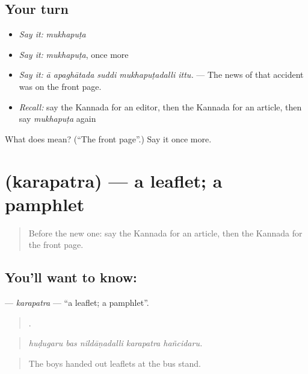 \subsection*{Your turn}
\begin{itemize}
\raggedright
  \item \emph{Say it:} \emph{mukhapuṭa}
  \item \emph{Say it:} \emph{mukhapuṭa}, once more
  \item \emph{Say it:} \emph{ā apaghātada suddi mukhapuṭadalli ittu.} — The news of that accident was on the front page.
  \item \emph{Recall:} say the Kannada for an editor, then the Kannada for an article, then say \emph{mukhapuṭa} again
\end{itemize}

\begin{tcolorbox}[breakable,colback=teal!4,colframe=teal!35!black,title={Before you move on}]
What does  mean? (\textquotedblleft{}The front page\textquotedblright{}.) Say it once more.
\end{tcolorbox}
\section[\texorpdfstring{\kn{ಕರಪತ್ರ} (karapatra)}{ಕರಪತ್ರ (karapatra)}]{ (karapatra) — a leaflet; a pamphlet}

\label{lesson:KA-C335-karapatra}



\begin{quote}
Before the new one: say the Kannada for an article, then the Kannada for the front page.
\end{quote}

\subsection*{You'll want to know: }
\textbf{} — \emph{karapatra} — \textquotedblleft{}a leaflet; a pamphlet\textquotedblright{}.

\begin{quote}
    .
\end{quote}

\begin{quote}
\emph{huḍugaru bas nildāṇadalli karapatra hañcidaru.}
\end{quote}

\begin{quote}
The boys handed out leaflets at the bus stand.
\end{quote}

